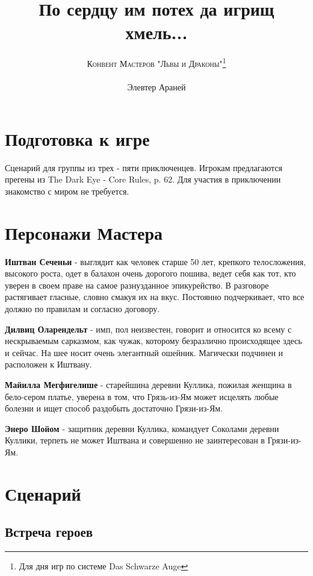\documentclass[twoside,twocolumn]{article}
\title{По сердцу им потех да игрищ хмель...} %
\author{\textsc{Конвент Мастеров "Львы и Драконы"}\thanks{Для дня игр по системе Das Schwarze Auge} \\[1ex] \\ %
\normalsize {Элевтер Араней}
}
\date{} 								%
\begin{document}
\renewcommand{\abstractname}{\vspace{-\baselineskip}}

\maketitle

\section{Подготовка к игре}
Сценарий для группы из трех - пяти приключенцев. Игрокам предлагаются прегены из The Dark Eye - Core Rules, p. 62. Для участия в приключении знакомство с миром не требуется.

\section{Персонажи Мастера}
\textbf{Иштван Сеченьи} - выглядит как человек старше 50 лет, крепкого телосложения, высокого роста, одет в балахон очень дорогого пошива, ведет себя как тот, кто уверен в своем праве на самое разнузданное эпикурейство. В разговоре растягивает гласные, словно смакуя их на вкус. Постоянно подчеркивает, что все должно по правилам и согласно договору.

\textbf{Дилвиц Оларендельт} - имп, пол неизвестен, говорит и относится ко всему с нескрываемым сарказмом, как чужак, которому безразлично происходящее здесь и сейчас. На шее носит очень элегантный ошейник. Магически подчинен и расположен к Иштвану.  

\textbf{Майилла Мегфигелише} - старейшина деревни Куллика, пожилая женщина в бело-сером платье, уверена в том, что Грязь-из-Ям может исцелять любые болезни и ищет способ раздобыть достаточно Грязи-из-Ям. 

\textbf{Энеро Шойом} - защитник деревни Куллика, командует Соколами деревни Куллики, терпеть не может Иштвана и совершенно не заинтересован в Грязи-из-Ям. 

\section{Сценарий}

\subsection{Встреча героев}
\end{document}
